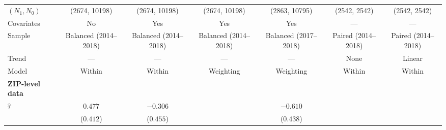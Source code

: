 \begin{table}[tbh]
\begin{threeparttable}
\begin{tabular}{lcccccc}
\quad $(N_1, N_0)$               &                            (2674, 10198) &                            (2674, 10198) &                            (2674, 10198) &                            (2863, 10795) &                             (2542, 2542) &                             (2542, 2542) \\
\quad Covariates                 &                                       No &                                      Yes &                                      Yes &                                      Yes &                                      --- &                                      --- \\
\quad Sample                     &                    Balanced (2014--2018) &                    Balanced (2014--2018) &                    Balanced (2014--2018) &                    Balanced (2017--2018) &                      Paired (2014--2018) &                      Paired (2014--2018) \\
\quad Trend                      &                                      --- &                                      --- &                                      --- &                                      --- &                                     None &                                   Linear \\
\quad Model                      &                                   Within &                                   Within &                                Weighting &                                Weighting &                                   Within &                                   Within \\
\midrule \textbf{ZIP-level data} &                                          &                                          &                                          &                                          &                                          &                                          \\
\quad $\hat \tau$                &                                  $0.477$ &                                 $-0.306$ &                                          &                                 $-0.610$ &                                          &                                          \\
\quad                            &                                ($0.412$) &                                ($0.455$) &                                          &                                ($0.438$) &                                          &                                          \\

\end{tabular}
\end{threeparttable}
\end{table}
